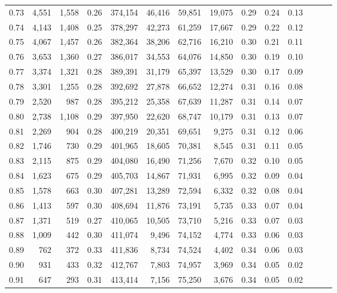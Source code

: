 \begin{tabular}{rrrrrrrrrrrrrr}
0.73 &  4,551 &  1,558 &  0.26 &  374,154 &   46,416 &  59,851 &  19,075 &  0.29 &  0.24 &      0.13 \\
0.74 &  4,143 &  1,408 &  0.25 &  378,297 &   42,273 &  61,259 &  17,667 &  0.29 &  0.22 &      0.12 \\
0.75 &  4,067 &  1,457 &  0.26 &  382,364 &   38,206 &  62,716 &  16,210 &  0.30 &  0.21 &      0.11 \\
0.76 &  3,653 &  1,360 &  0.27 &  386,017 &   34,553 &  64,076 &  14,850 &  0.30 &  0.19 &      0.10 \\
0.77 &  3,374 &  1,321 &  0.28 &  389,391 &   31,179 &  65,397 &  13,529 &  0.30 &  0.17 &      0.09 \\
0.78 &  3,301 &  1,255 &  0.28 &  392,692 &   27,878 &  66,652 &  12,274 &  0.31 &  0.16 &      0.08 \\
0.79 &  2,520 &    987 &  0.28 &  395,212 &   25,358 &  67,639 &  11,287 &  0.31 &  0.14 &      0.07 \\
0.80 &  2,738 &  1,108 &  0.29 &  397,950 &   22,620 &  68,747 &  10,179 &  0.31 &  0.13 &      0.07 \\
0.81 &  2,269 &    904 &  0.28 &  400,219 &   20,351 &  69,651 &   9,275 &  0.31 &  0.12 &      0.06 \\
0.82 &  1,746 &    730 &  0.29 &  401,965 &   18,605 &  70,381 &   8,545 &  0.31 &  0.11 &      0.05 \\
0.83 &  2,115 &    875 &  0.29 &  404,080 &   16,490 &  71,256 &   7,670 &  0.32 &  0.10 &      0.05 \\
0.84 &  1,623 &    675 &  0.29 &  405,703 &   14,867 &  71,931 &   6,995 &  0.32 &  0.09 &      0.04 \\
0.85 &  1,578 &    663 &  0.30 &  407,281 &   13,289 &  72,594 &   6,332 &  0.32 &  0.08 &      0.04 \\
0.86 &  1,413 &    597 &  0.30 &  408,694 &   11,876 &  73,191 &   5,735 &  0.33 &  0.07 &      0.04 \\
0.87 &  1,371 &    519 &  0.27 &  410,065 &   10,505 &  73,710 &   5,216 &  0.33 &  0.07 &      0.03 \\
0.88 &  1,009 &    442 &  0.30 &  411,074 &    9,496 &  74,152 &   4,774 &  0.33 &  0.06 &      0.03 \\
0.89 &    762 &    372 &  0.33 &  411,836 &    8,734 &  74,524 &   4,402 &  0.34 &  0.06 &      0.03 \\
0.90 &    931 &    433 &  0.32 &  412,767 &    7,803 &  74,957 &   3,969 &  0.34 &  0.05 &      0.02 \\
0.91 &    647 &    293 &  0.31 &  413,414 &    7,156 &  75,250 &   3,676 &  0.34 &  0.05 &      0.02 \\

\end{tabular}
